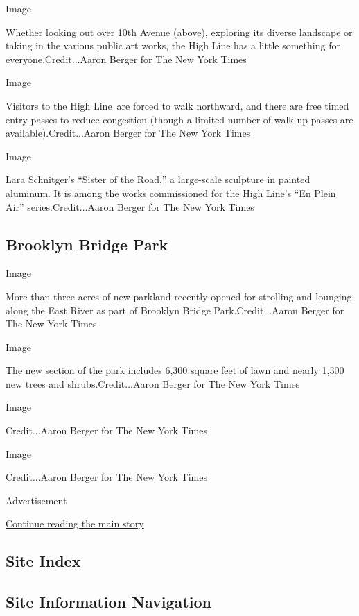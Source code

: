 Image

Whether looking out over 10th Avenue (above), exploring its diverse
landscape or taking in the various public art works, the High Line has a
little something for everyone.Credit...Aaron Berger for The New York
Times

Image

Visitors to the High Line~are forced to walk northward, and there are
free timed entry passes to reduce congestion (though a limited number of
walk-up passes are available).Credit...Aaron Berger for The New York
Times

Image

Lara Schnitger's ``Sister of the Road,'' a large-scale sculpture in
painted aluminum. It is among the works commissioned for the High Line's
``En Plein Air'' series.Credit...Aaron Berger for The New York Times

\hypertarget{brooklyn-bridge-park}{%
\subsection{Brooklyn Bridge Park}\label{brooklyn-bridge-park}}

Image

More than three acres of new parkland recently opened for strolling and
lounging along the East River as part of Brooklyn Bridge
Park.Credit...Aaron Berger for The New York Times

Image

The new section of the park includes 6,300 square feet of lawn and
nearly 1,300 new trees and shrubs.Credit...Aaron Berger for The New York
Times

Image

Credit...Aaron Berger for The New York Times

Image

Credit...Aaron Berger for The New York Times

Advertisement

\protect\hyperlink{after-bottom}{Continue reading the main story}

\hypertarget{site-index}{%
\subsection{Site Index}\label{site-index}}

\hypertarget{site-information-navigation}{%
\subsection{Site Information
Navigation}\label{site-information-navigation}}

